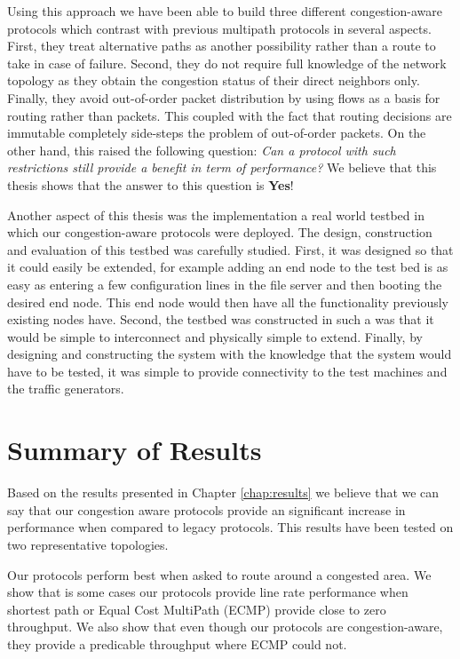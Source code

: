 Using this approach we have been able to build three different congestion-aware protocols which contrast with previous multipath protocols in several aspects. First, they treat alternative paths as another possibility rather than a route to take in case of failure. Second, they do not require full knowledge of the network topology as they obtain the congestion status of their direct neighbors only. Finally, they avoid out-of-order packet distribution by using flows as a basis for routing rather than packets. This coupled with the fact that routing decisions are immutable completely side-steps the problem of out-of-order packets. On the other hand, this raised the following question: \textit{Can a protocol with such restrictions still provide a benefit in term of performance?} We believe that this thesis shows that the answer to this question is \textbf{Yes}!

Another aspect of this thesis was the implementation a real world testbed in which our congestion-aware protocols were deployed. The design, construction and evaluation of this testbed was carefully studied. First, it was designed so that it could easily be extended, for example adding an end node to the test bed is as easy as entering a few configuration lines in the file server and then booting the desired end node. This end node would then have all the functionality previously existing nodes have. Second, the testbed was constructed in such a was that it would be simple to interconnect and physically simple to extend. Finally, by designing and constructing the system with the knowledge that the system would have to be tested, it was simple to provide connectivity to the test machines and the traffic generators. 

\section{Summary of Results}

Based on the results presented in Chapter \ref{chap:results} we believe that we can say that our congestion aware protocols provide an significant increase in performance when compared to legacy protocols. This results have been tested on two representative topologies.

Our protocols perform best when asked to route around a congested area. We show that is some cases our protocols provide line rate performance when shortest path or Equal Cost MultiPath (ECMP) provide close to zero throughput. We also show that even though our protocols are congestion-aware, they provide a predicable throughput where ECMP could not. 

